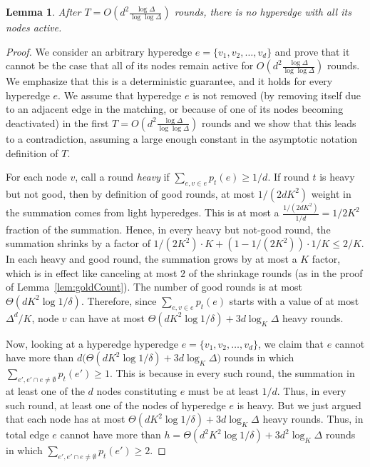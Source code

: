 \documentclass[11pt]{article}
\newtheorem{lemma}[theorem]{Lemma}
\begin{document}
\begin{lemma}\label{lem:MaximalityAmongActives} After $T=O(d^2 \frac{\log \Delta}{\log\log \Delta})$ rounds, there is no hyperedge with all its nodes active.
\end{lemma}
\begin{proof} We consider an arbitrary hyperedge $e=\{v_1, v_2, \dots, v_d\}$ and prove that it cannot be the case that all of its nodes remain active for $O(d^2 \frac{\log \Delta}{\log\log \Delta})$ rounds. We emphasize that this is a deterministic guarantee, and it holds for every hyperedge $e$. We assume that hyperedge $e$ is not removed (by removing itself due to an adjacent edge in the matching, or because of one of its nodes becoming deactivated) in the first $T=O(d^2 \frac{\log \Delta}{\log\log \Delta})$ rounds and we show that this leads to a contradiction, assuming a large enough constant in the asymptotic notation definition of $T$.

For each node $v$, call a round \emph{heavy} if $\sum_{e, v\in e} p_{t}(e) \geq 1/d$. If round $t$ is heavy but not good, then by definition of good rounds, at most $1/(2dK^2)$ weight in the summation comes from light hyperedges. This is at most a $\frac{1/(2dK^2)}{1/d} =1/2K^2$ fraction of the summation. Hence, in every heavy but not-good round, the summation shrinks by a factor of $1/(2K^2) \cdot K + (1-1/(2K^2)) \cdot 1/K\leq 2/K$. In each heavy and good round, the summation grows by at most a $K$ factor, which is in effect like canceling at most $2$ of the shrinkage rounds (as in the proof of Lemma~\ref{lem:goldCount}). The number of good rounds is at most $\Theta(dK^2\log 1/\delta)$. Therefore, since $\sum_{e, v\in e} p_{t}(e)$ starts with a value of at most $\Delta^d/K$, node $v$ can have at most $\Theta(dK^2\log 1/\delta) + 3d\log_{K}{\Delta}$ heavy rounds.

Now, looking at a hyperedge hyperedge $e=\{v_1, v_2, \dots, v_d\}$, we claim that $e$ cannot have more than $d\big(\Theta(dK^2\log 1/\delta) + 3d\log_{K}{\Delta}\big)$ rounds in which $\sum_{e', e'\cap e\neq\emptyset} p_{t}(e') \geq 1$. This is because in every such round, the summation in at least one of the $d$ nodes constituting $e$ must be at least $1/d$. Thus, in every such round, at least one of the nodes of hyperedge $e$ is heavy. But we just argued that each node has at most $\Theta(dK^2\log 1/\delta) + 3d\log_{K}{\Delta}$ heavy rounds. Thus, in total edge $e$ cannot have more than $h=\Theta(d^2K^2\log 1/\delta) + 3d^2\log_{K}{\Delta}$ rounds in which $\sum_{e', e'\cap e\neq\emptyset} p_{t}(e') \geq 2$.


\end{proof}
\end{document}

